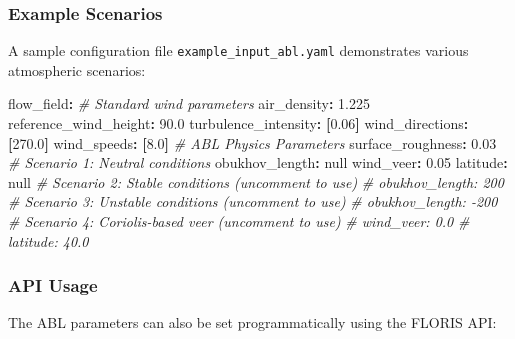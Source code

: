 \documentclass[
]{article}
\newenvironment{Shaded}{}{}
\newcommand{\AttributeTok}[1]{\textcolor[rgb]{0.49,0.56,0.16}{#1}}
\newcommand{\CharTok}[1]{\textcolor[rgb]{0.25,0.44,0.63}{#1}}
\newcommand{\CommentTok}[1]{\textcolor[rgb]{0.38,0.63,0.69}{\textit{#1}}}
\newcommand{\FloatTok}[1]{\textcolor[rgb]{0.25,0.63,0.44}{#1}}
\newcommand{\FunctionTok}[1]{\textcolor[rgb]{0.02,0.16,0.49}{#1}}
\newcommand{\KeywordTok}[1]{\textcolor[rgb]{0.00,0.44,0.13}{\textbf{#1}}}
\begin{document}
\hypertarget{example-scenarios}{%
\subsubsection{Example Scenarios}\label{example-scenarios}}

A sample configuration file \texttt{example\_input\_abl.yaml}
demonstrates various atmospheric scenarios:

\begin{Shaded}
\begin{Highlighting}[]
\FunctionTok{flow\_field}\KeywordTok{:}
\CommentTok{  \# Standard wind parameters}
\AttributeTok{  }\FunctionTok{air\_density}\KeywordTok{:}\AttributeTok{ }\FloatTok{1.225}
\AttributeTok{  }\FunctionTok{reference\_wind\_height}\KeywordTok{:}\AttributeTok{ }\FloatTok{90.0}
\AttributeTok{  }\FunctionTok{turbulence\_intensity}\KeywordTok{:}\AttributeTok{ }\KeywordTok{[}\FloatTok{0.06}\KeywordTok{]}
\AttributeTok{  }\FunctionTok{wind\_directions}\KeywordTok{:}\AttributeTok{ }\KeywordTok{[}\FloatTok{270.0}\KeywordTok{]}
\AttributeTok{  }\FunctionTok{wind\_speeds}\KeywordTok{:}\AttributeTok{ }\KeywordTok{[}\FloatTok{8.0}\KeywordTok{]}
\AttributeTok{  }
\CommentTok{  \# ABL Physics Parameters}
\AttributeTok{  }\FunctionTok{surface\_roughness}\KeywordTok{:}\AttributeTok{ }\FloatTok{0.03}
\AttributeTok{  }
\CommentTok{  \# Scenario 1: Neutral conditions}
\AttributeTok{  }\FunctionTok{obukhov\_length}\KeywordTok{:}\AttributeTok{ }\CharTok{null}
\AttributeTok{  }\FunctionTok{wind\_veer}\KeywordTok{:}\AttributeTok{ }\FloatTok{0.05}
\AttributeTok{  }\FunctionTok{latitude}\KeywordTok{:}\AttributeTok{ }\CharTok{null}
\AttributeTok{  }
\CommentTok{  \# Scenario 2: Stable conditions (uncomment to use)}
\CommentTok{  \# obukhov\_length: 200}
\AttributeTok{  }
\CommentTok{  \# Scenario 3: Unstable conditions (uncomment to use)}
\CommentTok{  \# obukhov\_length: {-}200}
\AttributeTok{  }
\CommentTok{  \# Scenario 4: Coriolis{-}based veer (uncomment to use)}
\CommentTok{  \# wind\_veer: 0.0}
\CommentTok{  \# latitude: 40.0}
\end{Highlighting}
\end{Shaded}

\hypertarget{api-usage}{%
\subsubsection{API Usage}\label{api-usage}}

The ABL parameters can also be set programmatically using the FLORIS
API:
\end{document}
